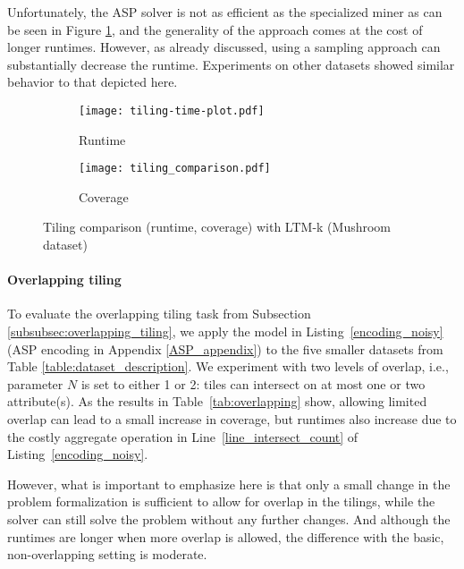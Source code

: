 Unfortunately, the ASP solver is not as efficient as the specialized miner as can be seen in Figure \ref{fig:tiling_time_comparison}, and the generality of the approach comes at the cost of longer runtimes. However, as already discussed, using a sampling approach can substantially decrease the runtime. Experiments on other datasets showed similar behavior to that depicted here.

\begin{figure}[t]
      \captionsetup{
                   skip=-2pt
                 }
  \begin{center}
    \begin{subfigure}{.49\textwidth}
      \texttt{[image: tiling-time-plot.pdf]}
      \caption{Runtime}
      \label{fig:tiling_time_comparison}
    \end{subfigure}
    \hfill 
    \begin{subfigure}{.49\textwidth}
      \texttt{[image: tiling\_comparison.pdf]}
      \caption{Coverage}
      \label{fig:tiling_comparison}
    \end{subfigure}
  \caption{Tiling comparison (runtime, coverage) with LTM-k (Mushroom dataset)}
  \end{center}
\end{figure}

\paragraph{Overlapping tiling}
To evaluate the overlapping tiling task from Subsection \ref{subsubsec:overlapping_tiling}, we apply the model in Listing~\ref{encoding_noisy} (ASP encoding in Appendix \ref{ASP_appendix}) to the five smaller datasets from Table \ref{table:dataset_description}. We experiment with two levels of overlap, i.e., parameter $N$ is set to either 1 or 2: tiles can intersect on at most one or two attribute(s). As the results in Table~\ref{tab:overlapping} show, allowing limited overlap can lead to a small increase in coverage, but runtimes also increase due to the costly aggregate operation in Line~\ref{line_intersect_count} of Listing~\ref{encoding_noisy}. 

However, what is important to emphasize here is that only a small change in the problem formalization is sufficient to allow for overlap in the tilings, while the solver can still solve the problem without any further changes. And although the runtimes are longer when more overlap is allowed, the difference with the basic, non-overlapping setting is moderate.


